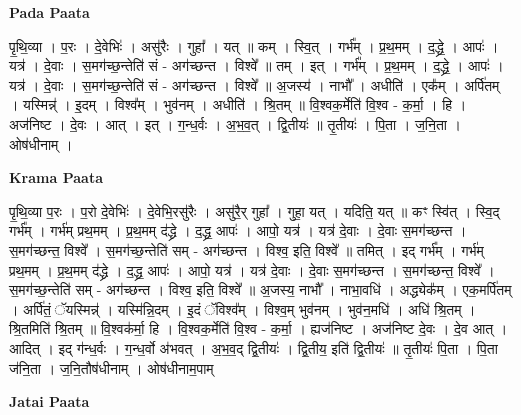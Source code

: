\documentclass[17pt]{extarticle}
\begin{document}
\textbf{Pada Paata} \newline

पृ॒थि॒व्या । प॒रः । दे॒वेभिः॑ । असु॑रैः । गुहा᳚ । यत् ॥ कम् । स्वि॒त् । गर्भ᳚म् । प्र॒थ॒मम् । द॒द्ध्रे॒ । आपः॑ । यत्र॑ । दे॒वाः । स॒मग॑च्छ॒न्तेति॑ सं - अग॑च्छन्त । विश्वे᳚ ॥ तम् । इत् । गर्भ᳚म् । प्र॒थ॒मम् । द॒द्ध्रे॒ । आपः॑ । यत्र॑ । दे॒वाः । स॒मग॑च्छ॒न्तेति॑ सं - अग॑च्छन्त । विश्वे᳚ ॥ अ॒जस्य॑ । नाभौ᳚ । अधीति॑ । एक᳚म् । अर्पि॑तम् । यस्मिन्न्॑ । इ॒दम् । विश्व᳚म् । भुव॑नम् । अधीति॑ । श्रि॒तम् ॥ वि॒श्वक॒र्मेति॑ वि॒श्व - क॒र्मा॒ । हि । अज॑निष्ट । दे॒वः । आत् । इत् । ग॒न्ध॒र्वः । अ॒भ॒व॒त् । द्वि॒तीयः॑ ॥ तृ॒तीयः॑ । पि॒ता । ज॒नि॒ता । ओष॑धीनाम् ।  \newline


\textbf{Krama Paata} \newline

पृ॒थि॒व्या प॒रः । प॒रो दे॒वेभिः॑ । दे॒वेभि॒रसु॑रैः । असु॑रै॒र् गुहा᳚ । गुहा॒ यत् । यदिति॒ यत् ॥ कꣳ स्वि॑त् । स्वि॒द् गर्भ᳚म् । गर्भ॑म् प्रथ॒मम् । प्र॒थ॒मम् द॑द्ध्रे । द॒द्ध्र॒ आपः॑ । आपो॒ यत्र॑ । यत्र॑ दे॒वाः । दे॒वाः स॒मग॑च्छन्त । स॒मग॑च्छन्त॒ विश्वे᳚ । स॒मग॑च्छ॒न्तेति॑ सम् - अग॑च्छन्त । विश्व॒ इति॒ विश्वे᳚ ॥ तमित् । इद् गर्भ᳚म् । गर्भ॑म् प्रथ॒मम् । प्र॒थ॒मम् द॑द्ध्रे । द॒द्ध्र॒ आपः॑ । आपो॒ यत्र॑ । यत्र॑ दे॒वाः । दे॒वाः स॒मग॑च्छन्त । स॒मग॑च्छन्त॒ विश्वे᳚ । स॒मग॑च्छ॒न्तेति॑ सम् - अग॑च्छन्त । विश्व॒ इति॒ विश्वे᳚ ॥ अ॒जस्य॒ नाभौ᳚ । नाभा॒वधि॑ । अद्ध्येक᳚म् । एक॒मर्पि॑तम् । अर्पि॑तं॒ ॅयस्मिन्न्॑ । यस्मि॑न्नि॒दम् । इ॒दं ॅविश्व᳚म् । विश्व॒म् भुव॑नम् । भुव॑न॒मधि॑ । अधि॑ श्रि॒तम् । श्रि॒तमिति॑ श्रि॒तम् ॥ वि॒श्वक॑र्मा॒ हि । वि॒श्वक॒र्मेति॑ वि॒श्व - क॒र्मा॒ । ह्यज॑निष्ट । अज॑निष्ट दे॒वः । दे॒व आत् । आदित् । इद् ग॑न्ध॒र्वः । ग॒न्ध॒र्वो अ॑भवत् । अ॒भ॒व॒द् द्वि॒तीयः॑ । द्वि॒तीय॒ इति॑ द्वि॒तीयः॑ ॥ तृ॒तीयः॑ पि॒ता । पि॒ता ज॑नि॒ता । ज॒नि॒तौष॑धीनाम् । ओष॑धीनाम॒पाम् \newline

\textbf{Jatai Paata} \newline
\end{document}
